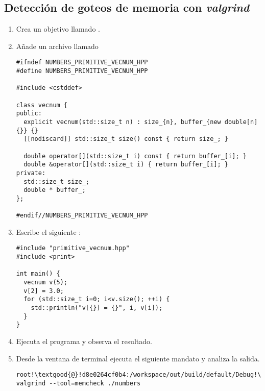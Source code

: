 \subsection{Detección de goteos de memoria con \emph{valgrind}}

\begin{enumerate}

\item
Crea un objetivo llamado .

\item Añade un archivo llamado 

\begin{lstlisting}
#ifndef NUMBERS_PRIMITIVE_VECNUM_HPP
#define NUMBERS_PRIMITIVE_VECNUM_HPP

#include <cstddef>

class vecnum {
public:
  explicit vecnum(std::size_t n) : size_{n}, buffer_{new double[n]{}} {}
  [[nodiscard]] std::size_t size() const { return size_; }

  double operator[](std::size_t i) const { return buffer_[i]; }
  double &operator[](std::size_t i) { return buffer_[i]; }
private:
  std::size_t size_;
  double * buffer_;
};

#endif//NUMBERS_PRIMITIVE_VECNUM_HPP
\end{lstlisting}

\item
Escribe el siguiente :

\begin{lstlisting}
#include "primitive_vecnum.hpp"
#include <print>

int main() {
  vecnum v(5);
  v[2] = 3.0;
  for (std::size_t i=0; i<v.size(); ++i) {
    std::println("v[{}] = {}", i, v[i]);
  }
}
\end{lstlisting}

\item
Ejecuta el programa y observa el resultado.

\item
Desde la ventana de terminal ejecuta el siguiente mandato y analiza la salida.

\begin{lstlisting}[style=terminal,escapechar=!]
root!\textgood{@}!d8e0264cf0b4:/workspace/out/build/default/Debug!\textgood{\#}! valgrind --tool=memcheck ./numbers
\end{lstlisting}

\end{enumerate}
